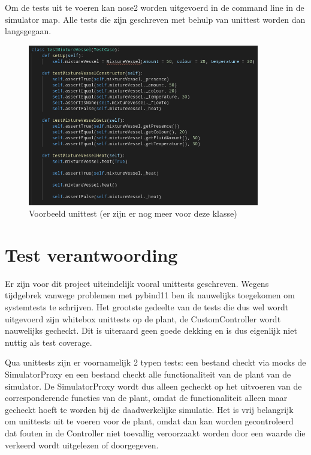 \documentclass{article}
\begin{document}
    Om de tests uit te voeren kan nose2 worden uitgevoerd in de command line in de simulator map. Alle tests die zijn geschreven met behulp van unittest worden dan langsgegaan.
    
    \begin{figure}[H]
    	\centering
    	\includegraphics[width=0.9\textwidth]{figures/setup.png}
    	\caption{Voorbeeld unittest (er zijn er nog meer voor deze klasse)}
    \end{figure}

	\section{Test verantwoording}
	Er zijn voor dit project uiteindelijk vooral unittests geschreven. Wegens tijdgebrek vanwege problemen met pybind11 ben ik nauwelijks toegekomen om systemtests te schrijven. Het grootste gedeelte van de tests die dus wel wordt uitgevoerd zijn whitebox unittests op de plant, de CustomController wordt nauwelijks gecheckt. Dit is uiteraard geen goede dekking en is dus eigenlijk niet nuttig als test coverage.
	
	Qua unittests zijn er voornamelijk 2 typen tests: een bestand checkt via mocks de SimulatorProxy en een bestand checkt alle functionaliteit van de plant van de simulator. De SimulatorProxy wordt dus alleen gecheckt op het uitvoeren van de corresponderende functies van de plant, omdat de functionaliteit alleen maar gecheckt hoeft te worden bij de daadwerkelijke simulatie. Het is vrij belangrijk om unittests uit te voeren voor de plant, omdat dan kan worden gecontroleerd dat fouten in de Controller niet toevallig veroorzaakt worden door een waarde die verkeerd wordt uitgelezen of doorgegeven.
    
\end{document}
